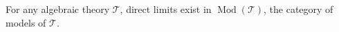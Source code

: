 For any algebraic theory $\mathcal{T}$, direct limits exist in $\operatorname{Mod}(\mathcal{T})$, the category of models of $\mathcal{T}$.
